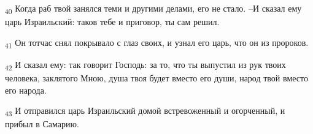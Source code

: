 \begin{tcolorbox}
\textsubscript{40} Когда раб твой занялся теми и другими делами, его не стало. --И сказал ему царь Израильский: таков тебе и приговор, ты сам решил.
\end{tcolorbox}
\begin{tcolorbox}
\textsubscript{41} Он тотчас снял покрывало с глаз своих, и узнал его царь, что он из пророков.
\end{tcolorbox}
\begin{tcolorbox}
\textsubscript{42} И сказал ему: так говорит Господь: за то, что ты выпустил из рук твоих человека, заклятого Мною, душа твоя будет вместо его души, народ твой вместо его народа.
\end{tcolorbox}
\begin{tcolorbox}
\textsubscript{43} И отправился царь Израильский домой встревоженный и огорченный, и прибыл в Самарию.
\end{tcolorbox}
